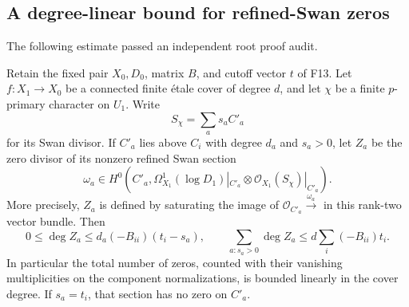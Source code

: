 \subsection{A degree-linear bound for refined-Swan zeros}

The following estimate passed an independent root proof audit.

\begin{proposition}
Retain the fixed pair $X_0,D_0$, matrix $B$, and cutoff vector $t$
of F13. Let $f:X_1\to X_0$ be a connected finite \'etale cover
of degree $d$, and let $\chi$ be a finite $p$-primary character
on $U_1$. Write
\[
 S_\chi=\sum_a s_aC'_a
\]
for its Swan divisor. If $C'_a$ lies above $C_i$ with degree $d_a$
and $s_a>0$, let $Z_a$ be the zero divisor of its nonzero refined
Swan section
\[
 \omega_a\in H^0\!\left(C'_a,
 \Omega^1_{X_1}(\log D_1)|_{C'_a}
                  \otimes\mathcal O_{X_1}(S_\chi)|_{C'_a}\right).
\]
More precisely, $Z_a$ is defined by saturating the image of
$\mathcal O_{C'_a}\xrightarrow{\omega_a}$ in this rank-two
vector bundle. Then
\[
 0\leq\deg Z_a\leq d_a(-B_{ii})(t_i-s_a),\qquad
 \sum_{a:s_a>0}\deg Z_a
       \leq d\sum_i(-B_{ii})t_i.
 \tag{F13.9}
\]
In particular the total number of zeros, counted with their
vanishing multiplicities on the component normalizations, is
bounded linearly in the cover degree. If $s_a=t_i$, that section
has no zero on $C'_a$.
\end{proposition}
